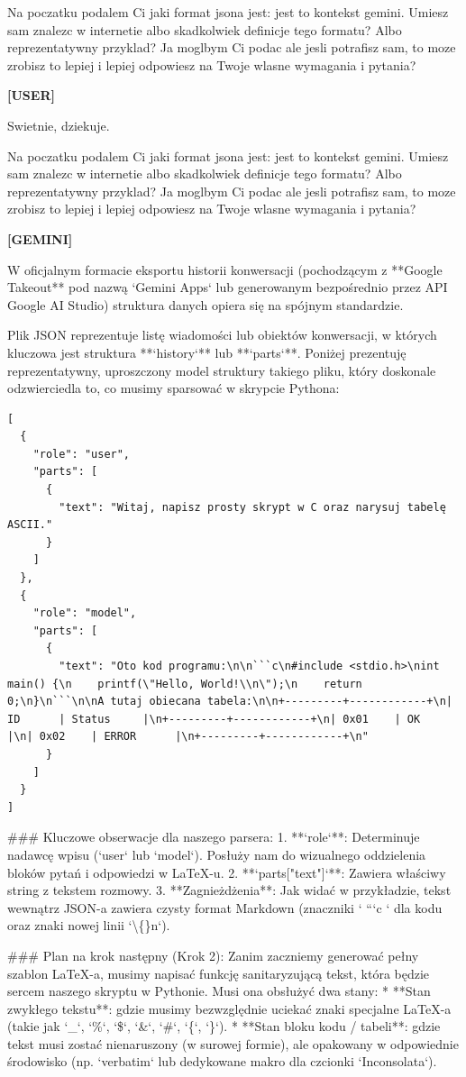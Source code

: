 \documentclass[10pt,a4paper]{article}
\newcommand{\UserTurn}{\textbf{[USER]}\par\medskip}
\newcommand{\ModelTurn}{\textbf{[GEMINI]}\par\medskip}
\newcommand{\Separator}{\par\vspace{4pt}\noindent{\color{rulecolor}\rule{\linewidth}{0.4pt}}\par\vspace{6pt}}
\begin{document}
Na poczatku podalem Ci jaki format jsona jest: jest to kontekst gemini. Umiesz sam znalezc w internetie albo skadkolwiek definicje tego formatu? Albo reprezentatywny przyklad? Ja moglbym Ci podac ale jesli potrafisz sam, to moze zrobisz to lepiej i lepiej odpowiesz na Twoje wlasne wymagania i pytania?
\Separator
\UserTurn
Swietnie, dziekuje.

Na poczatku podalem Ci jaki format jsona jest: jest to kontekst gemini. Umiesz sam znalezc w internetie albo skadkolwiek definicje tego formatu? Albo reprezentatywny przyklad? Ja moglbym Ci podac ale jesli potrafisz sam, to moze zrobisz to lepiej i lepiej odpowiesz na Twoje wlasne wymagania i pytania?
\Separator
\ModelTurn
W oficjalnym formacie eksportu historii konwersacji (pochodzącym z **Google Takeout** pod nazwą `Gemini Apps` lub generowanym bezpośrednio przez API Google AI Studio) struktura danych opiera się na spójnym standardzie.

Plik JSON reprezentuje listę wiadomości lub obiektów konwersacji, w których kluczowa jest struktura **`history`** lub **`parts`**. Poniżej prezentuję reprezentatywny, uproszczony model struktury takiego pliku, który doskonale odzwierciedla to, co musimy sparsować w skrypcie Pythona:

\begin{verbatim}
[
  {
    "role": "user",
    "parts": [
      {
        "text": "Witaj, napisz prosty skrypt w C oraz narysuj tabelę ASCII."
      }
    ]
  },
  {
    "role": "model",
    "parts": [
      {
        "text": "Oto kod programu:\n\n```c\n#include <stdio.h>\nint main() {\n    printf(\"Hello, World!\\n\");\n    return 0;\n}\n```\n\nA tutaj obiecana tabela:\n\n+---------+------------+\n| ID      | Status     |\n+---------+------------+\n| 0x01    | OK         |\n| 0x02    | ERROR      |\n+---------+------------+\n"
      }
    ]
  }
]
\end{verbatim}

\#\#\# Kluczowe obserwacje dla naszego parsera:
1. **`role`**: Determinuje nadawcę wpisu (`user` lub `model`). Posłuży nam do wizualnego oddzielenia bloków pytań i odpowiedzi w LaTeX-u.
2. **`parts["text"]`**: Zawiera właściwy string z tekstem rozmowy.
3. **Zagnieżdżenia**: Jak widać w przykładzie, tekst wewnątrz JSON-a zawiera czysty format Markdown (znaczniki ` ```c ` dla kodu oraz znaki nowej linii `\textbackslash\{\}n`).

\#\#\# Plan na krok następny (Krok 2):
Zanim zaczniemy generować pełny szablon LaTeX-a, musimy napisać funkcję sanitaryzującą tekst, która będzie sercem naszego skryptu w Pythonie. Musi ona obsłużyć dwa stany:
* **Stan zwykłego tekstu**: gdzie musimy bezwzględnie uciekać znaki specjalne LaTeX-a (takie jak `\_`, `\%`, `\$`, `\&`, `\#`, `\{`, `\}`).
* **Stan bloku kodu / tabeli**: gdzie tekst musi zostać nienaruszony (w surowej formie), ale opakowany w odpowiednie środowisko (np. `verbatim` lub dedykowane makro dla czcionki `Inconsolata`).
\end{document}
